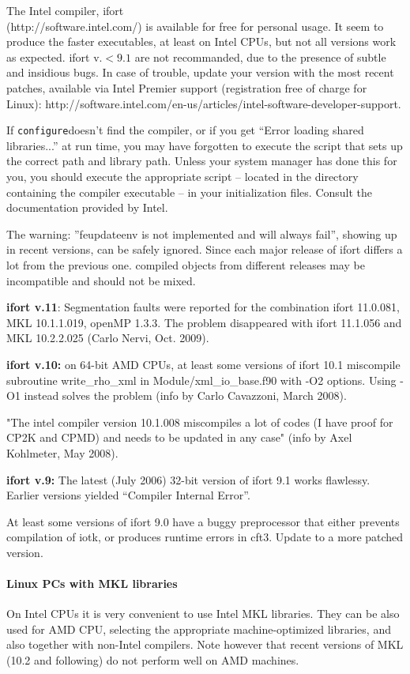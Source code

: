 \documentclass[12pt,a4paper]{article}
\def\configure{\texttt{configure}}
\begin{document}
The Intel compiler, ifort\\
 (http://software.intel.com/) is available for 
free for personal usage. It seem to produce the faster executables, 
at least on Intel CPUs, but not all versions work as expected.
ifort v.$<9.1$ are not recommanded, due to the presence of subtle 
and insidious bugs. In case of trouble, update your version with 
the most recent patches,
available via Intel Premier support (registration free of charge for Linux):
http://software.intel.com/en-us/articles/intel-software-developer-support.

If \configure doesn't find the compiler, or if you get 
``Error loading shared libraries...'' at run time, you may have 
forgotten to execute the script that
sets up the correct path and library path. Unless your system manager has
done this for you, you should execute the appropriate script -- located in
the directory containing the compiler executable -- in your
initialization files. Consult the documentation provided by Intel. 
    
The warning: ''feupdateenv is not implemented and will always fail'', 
showing up in recent versions, can be safely ignored.
Since each major release of ifort
differs a lot from the previous one. compiled objects from different 
releases may be incompatible and should not be mixed.    

{\bf ifort v.11}: Segmentation faults were reported for the combination 
ifort 11.0.081, MKL 10.1.1.019, openMP 1.3.3. The problem disappeared
with ifort 11.1.056 and MKL 10.2.2.025 (Carlo Nervi, Oct. 2009).

{\bf ifort v.10:} on 64-bit AMD CPUs, at least some versions of ifort 10.1 
miscompile subroutine write\_rho\_xml in Module/xml\_io\_base.f90 with -O2
options. Using -O1 instead solves the problem (info by Carlo
Cavazzoni, March 2008). 

"The intel compiler version 10.1.008 miscompiles a lot of codes (I have proof 
for CP2K and CPMD) and needs to be updated in any case" (info by Axel
Kohlmeter, May 2008).
 
{\bf ifort v.9:} The latest (July 2006) 32-bit version of ifort 9.1
works flawlessy. Earlier versions yielded ``Compiler Internal Error''.

At least some versions of ifort 9.0 have a buggy preprocessor that either
prevents compilation of iotk, or produces runtime errors in cft3. Update
to a more patched version.
    
\paragraph{Linux PCs with MKL libraries}
On Intel CPUs it is very convenient to use Intel MKL libraries. They can be
also used for AMD CPU, selecting the appropriate machine-optimized
libraries, and also together with non-Intel compilers. Note however
that recent versions of MKL (10.2 and following) do not perform
well on AMD machines.
\end{document}
